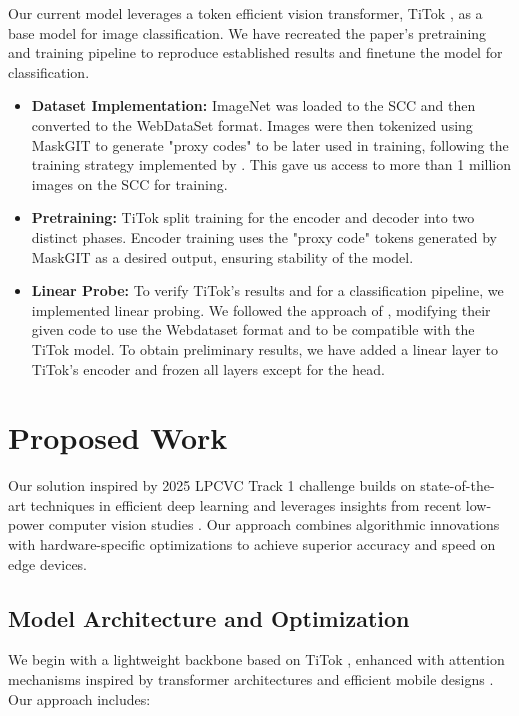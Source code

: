 \documentclass[11pt, oneside]{article}   	%
\begin{document}
Our current model leverages a token efficient vision transformer, TiTok \cite{yu2024imageworth32tokens}, as a base model for image classification. We have recreated the paper's pretraining and training pipeline to reproduce established results and finetune the model for classification. 

\begin{itemize}
    \item \textbf{Dataset Implementation:} ImageNet was loaded to the SCC and then converted to the WebDataSet format. Images were then tokenized using MaskGIT to generate "proxy codes" to be later used in training\cite{chang2022maskgitmaskedgenerativeimage}, following the training strategy implemented by \cite{yu2024imageworth32tokens}. This gave us access to more than 1 million images on the SCC for training.  
    \item \textbf{Pretraining:} TiTok split training for the encoder and decoder into two distinct phases. Encoder training uses the "proxy code" tokens generated by MaskGIT as a desired output, ensuring stability of the model. 
    \item \textbf{Linear Probe:} To verify TiTok's results and for a classification pipeline, we implemented linear probing. We followed the approach of  \cite{he2021maskedautoencodersscalablevision}, modifying their given code to use the Webdataset format and to be compatible with the TiTok model. To obtain preliminary results, we have added a linear layer to TiTok's encoder and frozen all layers except for the head.

\end{itemize}


\section*{Proposed Work}

Our solution inspired by 2025 LPCVC Track 1 challenge builds on state-of-the-art techniques in efficient deep learning and leverages insights from recent low-power computer vision studies \cite{chen20242023lowpowercomputervision}. Our approach combines algorithmic innovations with hardware-specific optimizations to achieve superior accuracy and speed on edge devices.

\subsection*{Model Architecture and Optimization}

We begin with a lightweight backbone based on TiTok \cite{yu2024imageworth32tokens}, enhanced with attention mechanisms inspired by transformer architectures \cite{dosovitskiy2021imageworth16x16words,touvron2021trainingdataefficientimagetransformers} and efficient mobile designs \cite{pan2022edgevitscompetinglightweightcnns}. Our approach includes:
\end{document}
